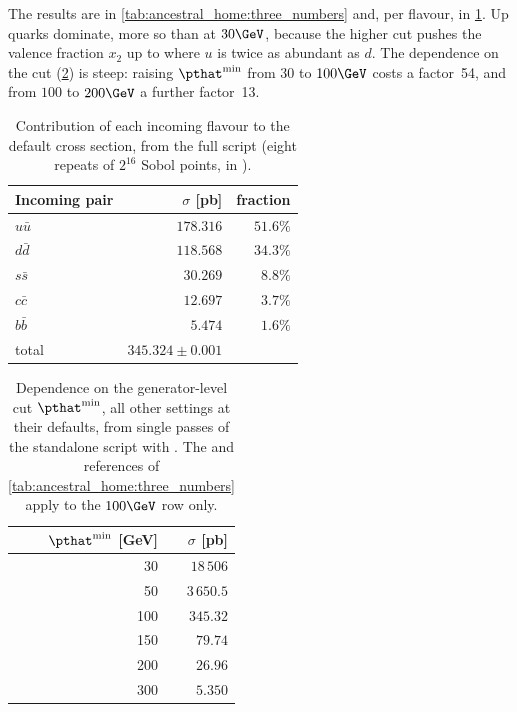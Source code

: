 The results are in \cref{tab:ancestral_home:three_numbers} and, per flavour,
in \cref{tab:ancestral_home:flavours}. Up quarks dominate, more so than at
$30\GeV$, because the higher cut pushes the valence fraction $x_2$ up to
where $u$ is twice as abundant as $d$. The dependence on the \pt cut
(\cref{tab:ancestral_home:ptscan}) is steep: raising $\pthat^{\min}$ from
$30$ to $100\GeV$ costs a factor~54, and from $100$ to $200\GeV$ a further
factor~13.

\begin{table}[htbp]\centering
\caption[Contribution of each incoming flavour]{Contribution of each
incoming flavour to the default cross section, from the full script
(eight repeats of $2^{16}$ Sobol points,  in
).}
\label{tab:ancestral_home:flavours}
\begin{tabular}{lrr}\toprule
Incoming pair & $\sigma$ [pb] & fraction \\ \midrule
$u\bar u$ & $178.316$ & $51.6\%$ \\
$d\bar d$ & $118.568$ & $34.3\%$ \\
$s\bar s$ & $30.269$ & $8.8\%$ \\
$c\bar c$ & $12.697$ & $3.7\%$ \\
$b\bar b$ & $5.474$ & $1.6\%$ \\ \midrule
total & $345.324 \pm 0.001$ & \\
\bottomrule
\end{tabular}
\end{table}

\begin{table}[htbp]\centering
\caption[Dependence on the generator-level cut $\pthat^{\min}$]{Dependence
on the generator-level cut $\pthat^{\min}$, all other settings at their
defaults, from single passes of the standalone script with
. The \CMSSW and \MG references of
\cref{tab:ancestral_home:three_numbers} apply to the $100\GeV$ row only.}
\label{tab:ancestral_home:ptscan}
\begin{tabular}{rr}\toprule
$\pthat^{\min}$ [GeV] & $\sigma$ [pb] \\ \midrule
30 & $18\,506$ \\
50 & $3\,650.5$ \\
100 & $345.32$ \\
150 & $79.74$ \\
200 & $26.96$ \\
300 & $5.350$ \\
\bottomrule
\end{tabular}
\end{table}

